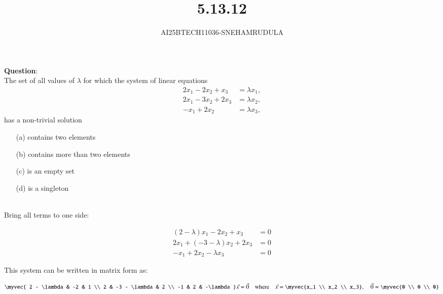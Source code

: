 \documentclass[journal]{IEEEtran}
\begin{document}

\vspace{3cm}

\title{5.13.12}
\author{AI25BTECH11036-SNEHAMRUDULA}
 \maketitle
{\let\newpage\relax\maketitle}
\renewcommand{\thefigure}{\theenumi}
\renewcommand{\thetable}{\theenumi}
\setlength{\intextsep}{10pt} 
\renewcommand{\thetable}{\theenumi}
\textbf{Question}:\\
The set of all values of $\lambda$ for which the system of linear equations
\[
\begin{aligned}
2x_{1} - 2x_{2} + x_{3} &= \lambda x_{1}, \\[6pt]
2x_{1} - 3x_{2} + 2x_{3} &= \lambda x_{2}, \\[6pt]
- x_{1} + 2x_{2} &= \lambda x_{3},
\end{aligned}
\]
has a non-trivial solution
\begin{enumerate}
  \item[(a)] contains two elements
  \item[(b)] contains more than two elements
  \item[(c)] is an empty set
  \item[(d)] is a singleton
\end{enumerate}

\solution \\
Bring all terms to one side:

\[
\begin{aligned}
(2 - \lambda)x_1 - 2x_2 + x_3 &= 0 \\
2x_1 + (-3 - \lambda)x_2 + 2x_3 &= 0 \\
-x_1 + 2x_2 - \lambda x_3 &= 0
\end{aligned}
\]

This system can be written in matrix form as:

\[
\myvec{
2 - \lambda & -2 & 1 \\
2 & -3 - \lambda & 2 \\
-1 & 2 & -\lambda
}
\vec{x}
= \vec{0}
\quad \text{where} \quad
\vec{x} = \myvec{x_1 \\ x_2 \\ x_3},\quad \vec{0} = \myvec{0 \\ 0 \\ 0}
\]
\end{document}
